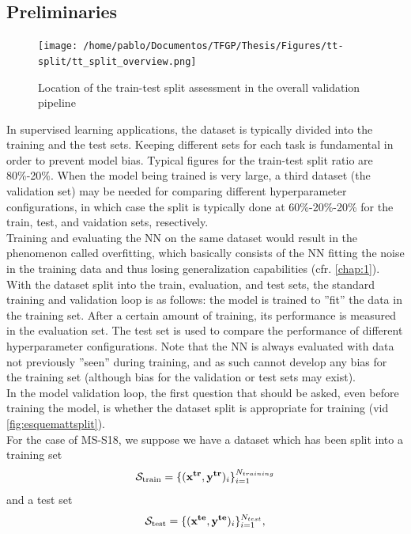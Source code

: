 \subsection{Preliminaries}
\begin{figure}[!b]
	\centering
	\texttt{[image: /home/pablo/Documentos/TFGP/Thesis/Figures/tt-split/tt\_split\_overview.png]}
	\caption{Location of the train-test split assessment in the overall validation pipeline}
	\label{fig:esquemattsplit}
\end{figure}
\indent In supervised learning applications, the dataset is typically divided into the training and the test sets. Keeping different sets for each task is fundamental in order to prevent model bias. Typical figures for the train-test split ratio are 80\%-20\%. When the model being trained is very large, a third dataset (the validation set) may be needed for comparing different hyperparameter configurations, in which case the split is typically done at 60\%-20\%-20\% for the train, test, and vaidation sets, resectively\cite[pp. 20-21]{Marsland2015Machine}.\\
%
\indent Training and evaluating the NN on the same dataset would result in the phenomenon called overfitting\cite[pp. 19-20]{Marsland2015Machine}, which basically consists of the NN fitting the noise in the training data and thus losing generalization capabilities (cfr. \autoref{chap:1}).\\
%
\indent With the dataset split into the train, evaluation, and test sets, the standard training and validation loop is as follows: the model is trained to ''fit'' the data in the training set. After a certain amount of training, its performance is measured in the evaluation set. The test set is used to compare the performance of different hyperparameter configurations. Note that the NN is always evaluated with data not previously ''seen'' during training, and as such cannot develop any bias for the training set (although bias for the validation or test sets may exist).\\
%
\indent In the model validation loop, the first question that should be asked, even before training the model, is whether the dataset split is appropriate for training (vid \autoref{fig:esquemattsplit}).\\
%
\indent For the case of MS-S18, we suppose we have a dataset which has been split into a training set
$${\cal S}_{\text{train}}=\{({\bf x^{tr}},{\bf y^{tr}})_i\}_{i=1}^{N_{training}}$$
and a test set
$${\cal S}_{\text{test}}=\{({\bf x^{te}},{\bf y^{te}})_i\}_{i=1}^{N_{test}},$$

